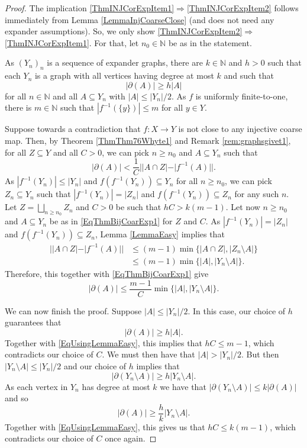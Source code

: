 \documentclass[11pt]{amsart}
\newcommand{\N}{\mathbb{N}}
\numberwithin{equation}{section}
\theoremstyle{definition}
\theoremstyle{remark}
\newcommand{\ri}{\partial}
\numberwithin{equation}{section}
\begin{document}
 
 
 \begin{proof}
 The implication \eqref{ThmINJCorExpItem1}$\Rightarrow$\eqref{ThmINJCorExpItem2} follows immediately from Lemma \ref{LemmaInjCoarseClose} (and does not need any expander assumptions). So, we only show \eqref{ThmINJCorExpItem2}$\Rightarrow$\eqref{ThmINJCorExpItem1}. For that, let $n_0\in\N$ be as in the statement.
 
 
 As $(Y_n)_n$ is a sequence of expander graphs, there are $k\in\N$ and $h>0$ such that each $Y_n$ is a graph with all vertices having degree at most $k$ and such that
\[|\partial (A)|\geq h|A|\]
for all $n\in\N$ and all $A\subseteq Y_n$ with $|A|\leq |Y_n|/2$. As $f$ is uniformly finite-to-one, there is $m\in \N$ such that $|f^{-1}(\{y\})|\leq m$ for all $y\in Y$.

Suppose towards a contradiction that $f\colon X\to Y$ is not close to any injective  coarse map. Then, by Theorem \ref{ThmThm76Whyte1} and Remark \ref{rem:graphsgivet1}, for all $Z\subseteq Y$ and all $C>0$, we can pick $n\geq n_0$ and $A\subseteq Y_n$ such that 
\begin{equation}\label{EqThmBijCoarExp1}
|\ri(A)|< \frac{1}{C}||A\cap Z|-|f^{-1}(A)||.
\end{equation}
As $|f^{-1}(Y_n)|\leq |Y_{n}|$ and $f(f^{-1}(Y_n))\subseteq Y_{n}$ for all $n\geq n_0$,   we can pick $Z_n\subseteq Y_n$ such that $|f^{-1}(Y_n)|=|Z_n|$ and $f(f^{-1}(Y_n))\subseteq Z_n$ for any such $n$. Let $Z=\bigsqcup_{n\geq n_0} Z_n$ and  $C>0$ be such that $hC>k(m-1)$. Let now   $n\geq n_0$ and $A\subseteq Y_n$ be as in \eqref{EqThmBijCoarExp1}  for $Z$ and $C$. As $|f^{-1}(Y_n)|=|Z_{n}|$ and $f(f^{-1}(Y_n))\subseteq Z_{n}$, Lemma \ref{LemmaEasy} implies that 
\begin{align*}||A\cap Z|-|f^{-1}(A)||& \leq (m-1)\min\{|A\cap Z|,|Z_n\setminus A|\}\\
& \leq (m-1)\min\{|A|,|Y_n\setminus A|\}.
\end{align*}
Therefore, this together with   \eqref{EqThmBijCoarExp1} give
\begin{equation}\label{EqUsingLemmaEasy}
|\ri( A)|\leq \frac{m-1}{C}\min\{|A|,|Y_{n}\setminus A|\}.
\end{equation}


We can now finish the proof. Suppose $|A|\leq |Y_{n}|/2$. In this case, our choice of $h$ guarantees that \[|\ri( A)|\geq h|A|.\] Together with \eqref{EqUsingLemmaEasy}, this implies that $hC\leq m-1$, which contradicts our choice of $C$. We must then have that $|A|>|Y_{n}|/2$. But then $|Y_{n}\setminus A|\leq |Y_n|/2$ and our choice of $h$ implies that 
\[|\partial (Y_{n}\setminus A)|\geq h|Y_n\setminus A|.\] 
As each vertex in $Y_{n}$ has degree at most $k$ we have that $|\partial (Y_{n}\setminus A)|\leq k|\partial(A)|$ and so 
\[
|\partial (A)|\geq \frac{h}{k}|Y_{n}\setminus A|.
\]
Together with \eqref{EqUsingLemmaEasy}, this gives us that $hC\leq k(m-1)$, which contradicts our choice of $C$ once again. 
 \end{proof}
\end{document}
